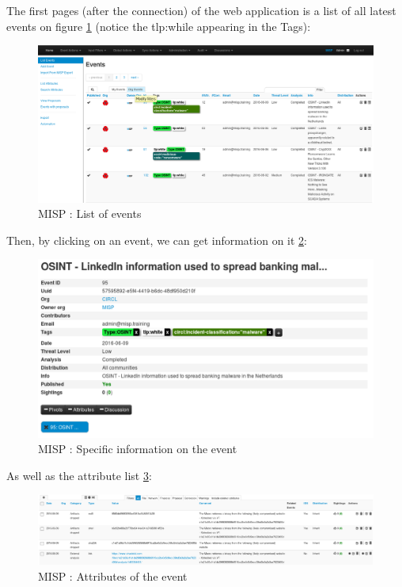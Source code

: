 \documentclass{eplmastersthesis}
\begin{document}
The first pages (after the connection) of the web application is a list of all latest events on figure \ref{webevents} (notice the tlp:while appearing in the Tags):

\begin{figure}[!h]
	\begin{center}
		\includegraphics[scale=0.32]{res/webEvents}
		\caption{MISP : List of events}
		\label{webevents}
	\end{center}
\end{figure}


Then, by clicking on an event, we can get information on it \ref{webevent}:


\begin{figure}[!h]
	\begin{center}
		\includegraphics[scale=0.35]{res/webEvent}
		\caption{MISP : Specific information on the event}
		\label{webevent}
	\end{center}
\end{figure}


As well as the attribute list \ref{webattributes}:
\begin{figure}[!h]
	\begin{center}
		\includegraphics[scale=0.35]{res/webAttributes}
		\caption{MISP : Attributes of the event}
		\label{webattributes}
	\end{center}
\end{figure}
\end{document}
